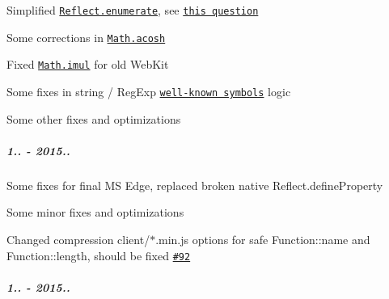 \begin{DoxyItemize}
\item Simplified \href{https://github.com/zloirock/core-js/#ecmascript-6-reflect}{\tt {\ttfamily Reflect.\+enumerate}}, see \href{https://esdiscuss.org/topic/question-about-enumerate-and-property-decision-timing}{\tt this question}
\item Some corrections in \href{https://github.com/zloirock/core-js/#ecmascript-6-math}{\tt {\ttfamily Math.\+acosh}}
\item Fixed \href{https://github.com/zloirock/core-js/#ecmascript-6-math}{\tt {\ttfamily Math.\+imul}} for old Web\+Kit
\item Some fixes in string / Reg\+Exp \href{https://github.com/zloirock/core-js/#ecmascript-6-regexp}{\tt well-\/known symbols} logic
\item Some other fixes and optimizations
\end{DoxyItemize}

\subparagraph*{1.. -\/ 2015..}


\begin{DoxyItemize}
\item Some fixes for final MS Edge, replaced broken native {\ttfamily Reflect.\+define\+Property}
\item Some minor fixes and optimizations
\item Changed compression {\ttfamily client/$\ast$.min.\+js} options for safe {\ttfamily Function\+::name} and {\ttfamily Function\+::length}, should be fixed \href{https://github.com/zloirock/core-js/issues/92}{\tt \#92}
\end{DoxyItemize}

\subparagraph*{1.. -\/ 2015..}


